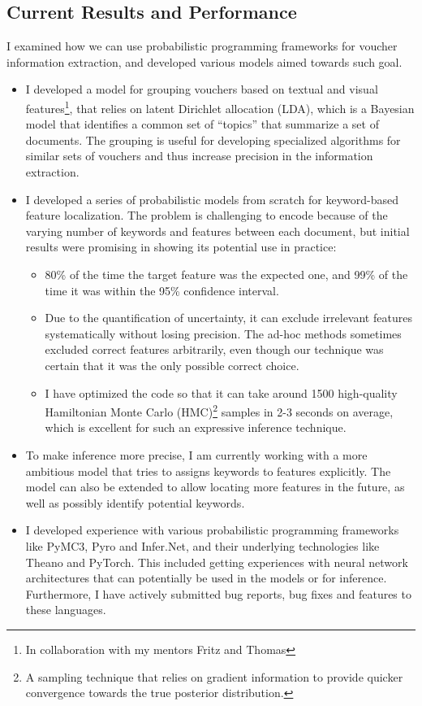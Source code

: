 \documentclass[12pt,a4paper]{article}
\begin{document}
\subsection{Current Results and Performance}
I examined how we can
use probabilistic programming frameworks for voucher information extraction, and
developed various models aimed towards such goal.
\begin{itemize}
\item I developed a model for grouping vouchers based on textual and visual
  features\footnote{In collaboration with my mentors Fritz and Thomas},
  that relies on latent Dirichlet allocation (LDA), which is a Bayesian model
  that identifies a common set of ``topics'' that summarize a set of documents.
  The grouping is useful for developing
  specialized algorithms for similar sets of vouchers and thus increase
  precision in the information extraction.
\item I developed a series of probabilistic models from scratch for
  keyword-based feature localization. The problem is challenging to encode
  because of the varying number of keywords and features between each document,
  but initial results were promising in showing its potential use in practice:
  \begin{itemize}
  \item 80\% of the time the target feature was the expected one, and 99\% of the time
    it was within the 95\% confidence interval.
  \item Due to the quantification of uncertainty, it can exclude irrelevant
    features systematically without losing precision. The ad-hoc methods
    sometimes excluded correct features arbitrarily, even though our technique
    was certain that it was the only possible correct choice.
  \item I have optimized the code so that it can take around 1500 high-quality Hamiltonian Monte Carlo
    (HMC)\footnote{A sampling technique that relies on gradient information to
      provide quicker convergence towards the true posterior distribution.}
    samples in 2-3 seconds on average, which is excellent for such an
    expressive inference technique.
  \end{itemize}
\item To make inference more precise, I am currently working with a more ambitious model that tries to assigns
  keywords to features explicitly. The model can
  also be extended to allow locating more features in the future, as well as possibly identify potential
  keywords.
\item I developed experience with various probabilistic programming
  frameworks like PyMC3, Pyro and Infer.Net, and their underlying technologies
  like Theano and PyTorch. This included getting experiences with neural network
  architectures that can potentially be used in the models or for inference.
  Furthermore, I have actively submitted bug reports, bug fixes and features to
  these languages.
\end{itemize}
\end{document}
